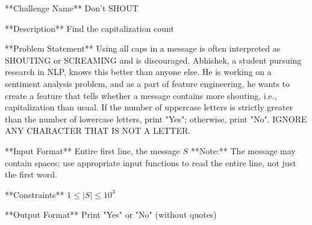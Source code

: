 **Challenge Name**  
Don't SHOUT

**Description**  
Find the capitalization count

**Problem Statement**  
Using all caps in a message is often interpreted as SHOUTING or SCREAMING and is discouraged. Abhishek, a student pursuing research in NLP, knows this better than anyone else. He is working on a sentiment analysis problem, and as a part of feature engineering, he wants to create a feature that tells whether a message contains more shouting, i.e., capitalization than usual. If the number of uppercase letters is strictly greater than the number of lowercase letters, print "Yes"; otherwise, print "No". IGNORE ANY CHARACTER THAT IS NOT A LETTER.

**Input Format**  
Entire first line, the message $S$  
**Note:** The message may contain spaces; use appropriate input functions to read the entire line, not just the first word.

**Constraints**  
$1 \leq |S| \leq 10^3$

**Output Format**  
Print "Yes" or "No" (without quotes)